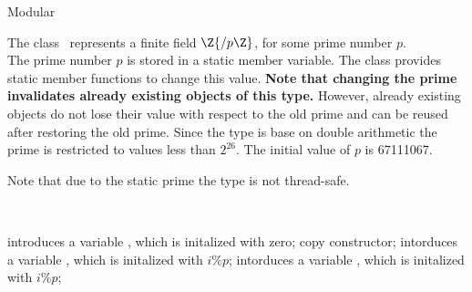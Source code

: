\begin{ccRefClass} {Modular}
\label{Modular}

\def\ccTagOperatorLayout{\ccFalse}

\ccDefinition

The class \ccRefName\ represents a finite field $\Z{/p\Z}$, 
for some prime number $p$. \\

The prime number $p$ is stored in a static member variable. 
The class provides static member functions to change this value. 
{\bf Note that changing the prime invalidates already existing objects 
of this type.}
However, already existing objects do not lose their value with respect to the 
old prime and can be reused after restoring the old prime. 
Since the type is base on double 
arithmetic the prime is restricted to values less than $2^{26}$. 
The initial value of $p$ is 67111067. 

Note that due to the static prime the type is not thread-safe.


\ccIsModel
{}\\


\ccCreation
{}

{introduces a variable \ccVar, which is initalized with zero;}
\ccGlue
{}
{copy constructor;}
\ccGlue
{}
{intorduces a variable \ccVar, which is initalized with $i \%  p$;}
\ccGlue
{}
{intorduces a variable \ccVar, which is initalized with $i \%  p$;}

\ccOperations

\ccGlue
{}
\ccGlue
{}


\ccGlue
{}\ccGlue

\ccGlue
{}\ccGlue
{}\ccGlue
{}\ccGlue

\ccGlue
{}\ccGlue
{}\ccGlue
{}\ccGlue

\end{ccRefClass} 
